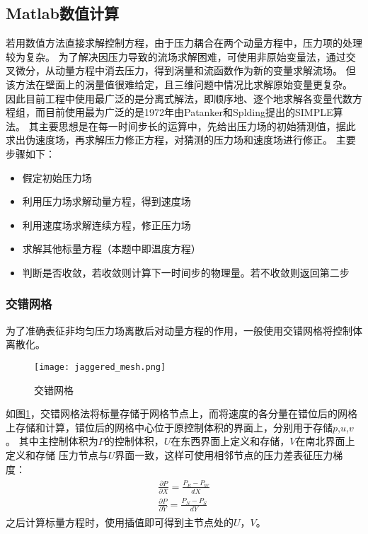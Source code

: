 \documentclass[UTF8]{article} %
\begin{document}
\subsection{Matlab数值计算}
若用数值方法直接求解控制方程，由于压力耦合在两个动量方程中，压力项的处理较为复杂。
为了解决因压力导致的流场求解困难，可使用非原始变量法，通过交叉微分，从动量方程中消去压力，得到涡量和流函数作为新的变量求解流场。
但该方法在壁面上的涡量值很难给定，且三维问题中情况比求解原始变量更复杂。
因此目前工程中使用最广泛的是分离式解法，即顺序地、逐个地求解各变量代数方程组，而目前使用最为广泛的是1972年由Patanker和Splding提出的SIMPLE算法。
其主要思想是在每一时间步长的运算中，先给出压力场的初始猜测值，据此求出伪速度场，再求解压力修正方程，对猜测的压力场和速度场进行修正。
主要步骤如下：
\begin{itemize}
  \item 假定初始压力场
  \item 利用压力场求解动量方程，得到速度场
  \item 利用速度场求解连续方程，修正压力场
  \item 求解其他标量方程（本题中即温度方程）
  \item 判断是否收敛，若收敛则计算下一时间步的物理量。若不收敛则返回第二步
\end{itemize}

\subsubsection{交错网格}
为了准确表征非均匀压力场离散后对动量方程的作用，一般使用交错网格将控制体离散化。
\begin{figure}[H]
  \centering
  \texttt{[image: jaggered\_mesh.png]}
  \caption{交错网格}
  \label{fig:mesh}
\end{figure}
如图\ref{fig:mesh}，交错网格法将标量存储于网格节点上，而将速度的各分量在错位后的网格上存储和计算，错位后的网格中心位于原控制体积的界面上，分别用于存储$p$,$u$,$v$。
其中主控制体积为$P$的控制体积，$U$在东西界面上定义和存储，$V$在南北界面上定义和存储
压力节点与$U$界面一致，这样可使用相邻节点的压力差表征压力梯度：
\begin{gather}
  \begin{gathered}
    \frac{\partial P}{\partial X}=\frac{P_E-P_W}{dX}\\
    \frac{\partial P}{\partial Y}=\frac{P_N-P_S}{dY}
  \end{gathered}
\end{gather}
之后计算标量方程时，使用插值即可得到主节点处的$U$，$V$。
\end{document}
